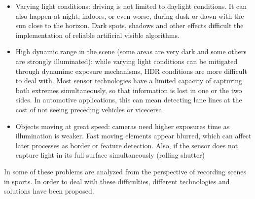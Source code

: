 \begin{itemize}
    \item Varying light conditions: driving is not limited to daylight 
    conditions. It can also happen at night, indoors, or even worse,
    during dusk or dawn with the sun close to the horizon. Dark spots,
    shadows and other effects difficult the implementation of reliable 
    artificial visible algorithms.
    
    \item High dynamic range in the scene (some areas are very dark 
    and some others are strongly illuminated): while varying light conditions
    can be mitigated through dynamimc exposure mechanisms, HDR conditions
    are more difficult to deal with. Most sensor technologies have a 
    limited capacity of capturing both extremes simultaneously, so that 
    information is lost in one or the two sides. In automotive applications, 
    this can mean detecting lane lines at the cost of not seeing preceding
    vehicles or vicecersa.
    
    
    \item Objects moving at great speed: cameras need higher exposures time as
    illumination is weaker. Fast moving elements appear blurred, which can 
    affect later processes as border or feature detection. Also, if the sensor
    does not capture light in its full surface simultaneously (rolling shutter)
\end{itemize}

In \cite{Pueo2016} some of these problems are analyzed from the perspective of
recording scenes in sports.
In order to deal with these difficulties, different technologies and solutions 
have been proposed. 

